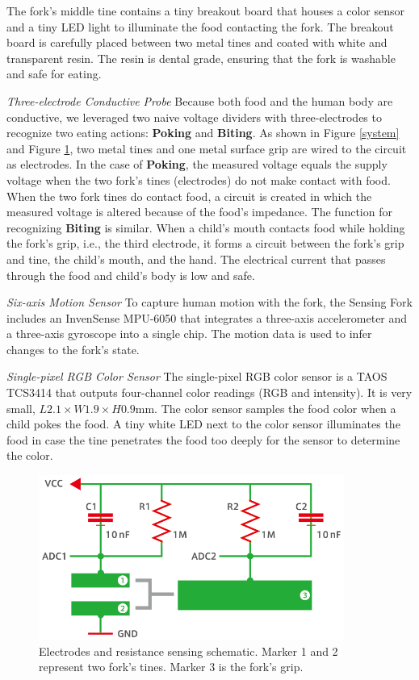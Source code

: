 The fork's middle tine contains a tiny breakout board 
that houses a color sensor and a tiny LED light to illuminate the food contacting the fork. 
The breakout board is carefully placed between two metal tines and coated with white and transparent resin. 
The resin is dental grade, ensuring that the fork is washable and safe for eating. 

\textit{Three-electrode Conductive Probe}
\newline
Because both food and the human body are conductive, we leveraged two naive voltage dividers 
with three-electrodes to recognize two eating actions: \textbf{Poking} and \textbf{Biting}. 
As shown in Figure \ref{system} and Figure \ref{electrode}, 
two metal tines and one metal surface grip are wired to the circuit as electrodes. 
In the case of \textbf{Poking}, the measured voltage equals the supply voltage 
when the two fork's tines (electrodes) do not make contact with food. 
When the two fork tines do contact food, 
a circuit is created in which the measured voltage is altered because of the food's impedance. 
The function for recognizing \textbf{Biting} is similar. 
When a child's mouth contacts food while holding the fork's grip, i.e., the third electrode, 
it forms a circuit between the fork's grip and tine, the child's mouth, and the hand. 
The electrical current that passes through the food and child's body is low and safe. 

\textit{Six-axis Motion Sensor}
\newline
To capture human motion with the fork, the Sensing Fork includes an InvenSense MPU-6050 that integrates a three-axis accelerometer and a three-axis gyroscope into a single chip. The motion data is used to infer changes to the fork's state. 

\textit{Single-pixel RGB Color Sensor}
\newline
The single-pixel RGB 
color sensor is a TAOS TCS3414 
that outputs four-channel color readings (RGB and intensity). 
It is very small, $L2.1 \times W1.9 \times H0.9$mm. 
The color sensor samples the food color when a child pokes the food. A tiny white LED next to the color sensor illuminates the food in case the tine penetrates the food too deeply for the sensor to determine the color. 

\begin{figure}[t]
\begin{center}
\includegraphics[width=10cm]{image/denkyoku02-02.png}
\caption{Electrodes and resistance sensing schematic. Marker 1 and 2 represent two fork's tines. Marker 3 is the fork's grip.}
\label{electrode}
\end{center}
\end{figure}

